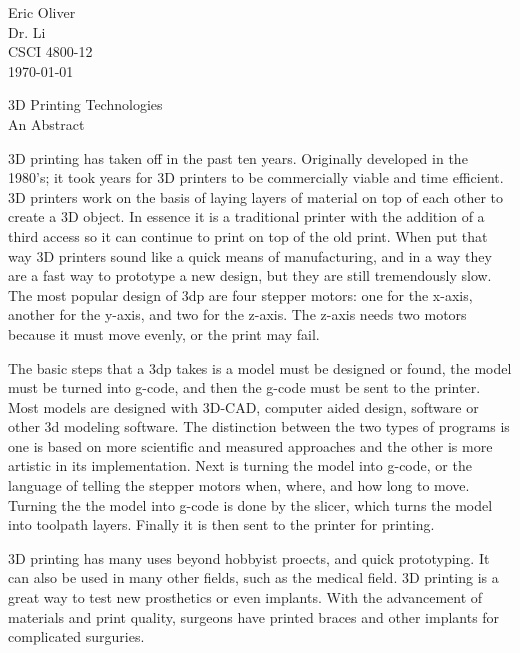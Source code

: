 \documentclass[12pt]{article}
\begin{document}
\begin{flushleft}

Eric Oliver \\
Dr. Li \\
CSCI 4800-12 \\
\today

\begin{center}
\large 3D Printing Technologies \\
An Abstract
\end{center}

\setlength{\parindent}{0.5in}


3D printing has taken off in the past ten years. Originally developed in the 1980's; it took years for 3D printers to be commercially viable and time efficient. 3D printers work on the basis of laying layers of material on top of each other to create a 3D object. In essence it is a traditional printer with the addition of a third access so it can continue to print on top of the old print. When put that way 3D printers sound like a quick means of manufacturing, and in a way they are a fast way to prototype a new design, but they are still tremendously slow. The most popular design of 3dp are four stepper motors: one for the x-axis, another for the y-axis, and two for the z-axis. The z-axis needs two motors because it must move evenly, or the print may fail.

The basic steps that a 3dp takes is a model must be designed or found, the model must be turned into g-code, and then the g-code must be sent to the printer. Most models are designed with 3D-CAD, computer aided design, software or other 3d modeling software. The distinction between the two types of programs is one is based on more scientific and measured approaches and the other is more artistic in its implementation. Next is turning the model into g-code, or the language of telling the stepper motors when, where, and how long to move. Turning the the model into g-code is done by the slicer, which turns the model into toolpath layers. Finally it is then sent to the printer for printing.

3D printing has many uses beyond hobbyist proects, and quick prototyping. It can also be used in many other fields, such as the medical field. 3D printing is a great way to test new prosthetics or even implants. With the advancement of materials and print quality, surgeons have printed braces and other implants for complicated surguries. 


\end{flushleft}
\end{document}
